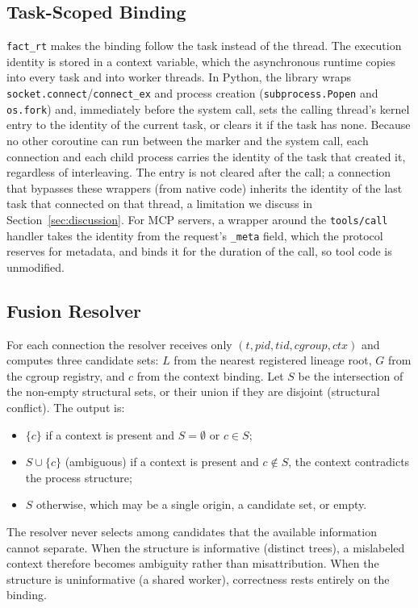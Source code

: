 \subsection{Task-Scoped Binding}
\texttt{fact\_rt} makes the binding follow the task instead of the thread. The execution identity is stored in a context variable, which the asynchronous runtime copies into every task and into worker threads. In Python, the library wraps \texttt{socket.connect}/\texttt{connect\_ex} and process creation (\texttt{subprocess.Popen} and \texttt{os.fork}) and, immediately before the system call, sets the calling thread's kernel entry to the identity of the current task, or clears it if the task has none. Because no other coroutine can run between the marker and the system call, each connection and each child process carries the identity of the task that created it, regardless of interleaving. The entry is not cleared after the call; a connection that bypasses these wrappers (\eg from native code) inherits the identity of the last task that connected on that thread, a limitation we discuss in Section~\ref{sec:discussion}. For MCP servers, a wrapper around the \texttt{tools/call} handler takes the identity from the request's \texttt{\_meta} field, which the protocol reserves for metadata, and binds it for the duration of the call, so tool code is unmodified.

\subsection{Fusion Resolver}
For each connection the resolver receives only $(t, \mathit{pid}, \mathit{tid}, \mathit{cgroup}, \mathit{ctx})$ and computes three candidate sets: $L$ from the nearest registered lineage root, $G$ from the cgroup registry, and $c$ from the context binding. Let $S$ be the intersection of the non-empty structural sets, or their union if they are disjoint (structural conflict). The output is:
\begin{itemize}
  \item $\{c\}$ if a context is present and $S=\emptyset$ or $c \in S$;
  \item $S \cup \{c\}$ (ambiguous) if a context is present and $c \notin S$, \ie the context contradicts the process structure;
  \item $S$ otherwise, which may be a single origin, a candidate set, or empty.
\end{itemize}
The resolver never selects among candidates that the available information cannot separate. When the structure is informative (distinct trees), a mislabeled context therefore becomes ambiguity rather than misattribution. When the structure is uninformative (a shared worker), correctness rests entirely on the binding.

